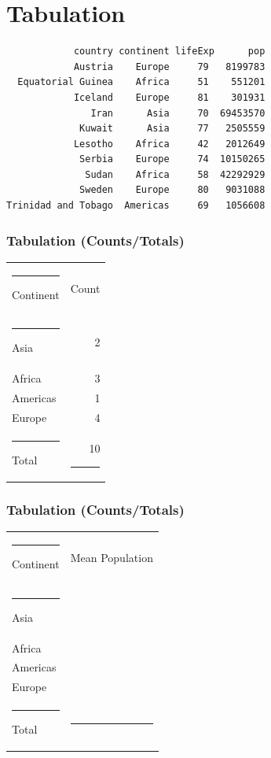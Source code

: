 \documentclass[17pt]{beamer} %
\begin{document}
\section{Tabulation}
\frame{\tableofcontents[currentsection]}


\begin{frame}[fragile]
\begin{verbatim}
            country continent lifeExp      pop
            Austria    Europe     79   8199783
  Equatorial Guinea    Africa     51    551201
            Iceland    Europe     81    301931
               Iran      Asia     70  69453570
             Kuwait      Asia     77   2505559
            Lesotho    Africa     42   2012649
             Serbia    Europe     74  10150265
              Sudan    Africa     58  42292929
             Sweden    Europe     80   9031088
Trinidad and Tobago  Americas     69   1056608
\end{verbatim}
\end{frame}

\begin{frame}[fragile]
\frametitle{Tabulation (Counts/Totals)}
\begin{center}
\begin{tabular}{lr} \hrule
Continent & Count \\ \hrule
Asia & 2 \\
Africa & 3 \\
Americas & 1 \\
Europe & 4 \\ \hrule
Total & 10 \hrule
\end{tabular}
\end{center}
\end{frame}

\begin{frame}[fragile]
\frametitle{Tabulation (Counts/Totals)}
\begin{center}
\begin{tabular}{lr} \hrule
Continent & Mean Population \\ \hrule
Asia &  \\
Africa &  \\
Americas &  \\
Europe &  \\ \hrule
Total &  \hrule
\end{tabular}
\end{center}
\end{frame}
\end{document}
